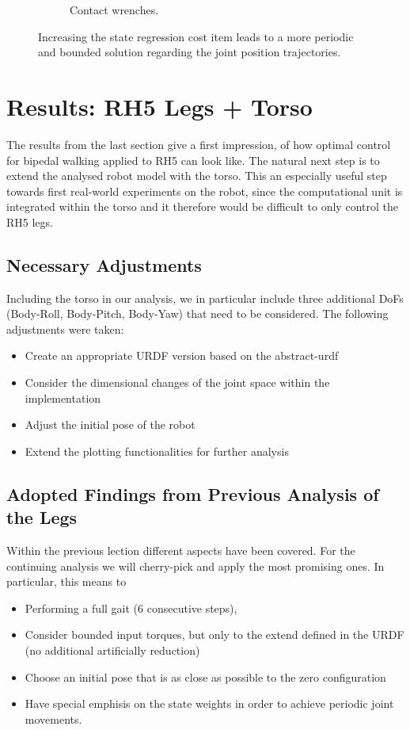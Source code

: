 \begin{figure}[h!]
\begin{subfigure}{.5\textwidth}
\caption{Contact wrenches.}
\end{subfigure}
\caption{Increasing the state regression cost item leads to a more periodic and bounded solution regarding the joint position trajectories.}
\label{fig:rh5_periodic}
\centering
\end{figure}



\section{Results: RH5 Legs + Torso}
The results from the last section give a first impression, of how optimal control for bipedal walking applied to RH5 can look like. The natural next step is to extend the analysed robot model with the torso. This an especially useful step towards first real-world experiments on the robot, since the computational unit is integrated within the torso and it therefore would be difficult to only control the RH5 legs. 

\subsection{Necessary Adjustments}
Including the torso in our analysis, we in particular include three additional DoFs (Body-Roll, Body-Pitch, Body-Yaw) that need to be considered. The following adjustments were taken:
\begin{itemize}
\item Create an appropriate URDF version based on the abstract-urdf
\item Consider the dimensional changes of the joint space within the implementation
\item Adjust the initial pose of the robot
\item Extend the plotting functionalities for further analysis
\end{itemize}

\subsection{Adopted Findings from Previous Analysis of the Legs}
Within the previous lection different aspects have been covered. For the continuing analysis we will cherry-pick and apply the most promising ones. In particular, this means to 
\begin{itemize}
\item Performing a full gait (6 consecutive steps),
\item Consider bounded input torques, but only to the extend defined in the URDF (no additional artificially reduction)
\item Choose an initial pose that is as close as possible to the zero configuration
\item Have special emphisis on the state weights in order to achieve periodic joint movements.
\end{itemize}

